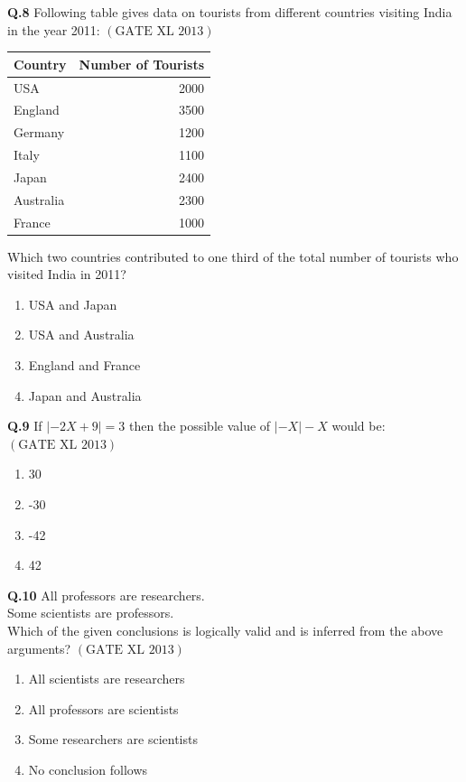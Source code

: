 \documentclass[12pt]{article}
\theoremstyle{remark}
\providecommand{\brak}[1]{\ensuremath{\left(#1\right)}}
\providecommand{\abs}[1]{\left\vert#1\right\vert}
\begin{document}
\textbf{Q.8}  
Following table gives data on tourists from different countries visiting India in the year 2011: \hfill $\brak{\text{GATE XL 2013}}$
\begin{center}
\begin{tabular}{|l|r|}
\hline
\textbf{Country} & \textbf{Number of Tourists} \\
\hline
USA & 2000 \\
England & 3500 \\
Germany & 1200 \\
Italy & 1100 \\
Japan & 2400 \\
Australia & 2300 \\
France & 1000 \\
\hline
\end{tabular}
\end{center}
Which two countries contributed to one third of the total number of tourists who visited India in 2011?
\begin{enumerate}
    \item USA and Japan
    \item USA and Australia
    \item England and France
    \item Japan and Australia
\end{enumerate}

\textbf{Q.9}  
If $\abs{-2X + 9} = 3$ then the possible value of $\abs{-X} - X$ would be: \hfill $\brak{\text{GATE XL 2013}}$
\begin{enumerate}
    \item 30
    \item -30
    \item -42
    \item 42
\end{enumerate}

\textbf{Q.10}  
All professors are researchers.\\
Some scientists are professors.\\
Which of the given conclusions is logically valid and is inferred from the above arguments? \hfill $\brak{\text{GATE XL 2013}}$
\begin{enumerate}
    \item All scientists are researchers
    \item All professors are scientists
    \item Some researchers are scientists
    \item No conclusion follows
\end{enumerate}
\end{document}
